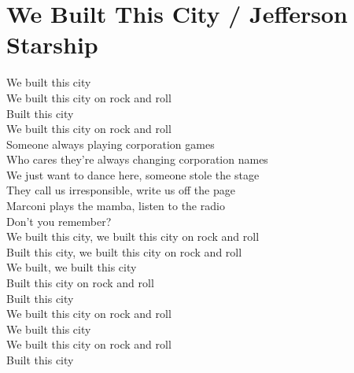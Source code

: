 \section{We Built This City / Jefferson Starship}\label{sec:webuiltthiscity}

  \Cmajor
  \Gmajor
  \Aminor
  \Fmajor
  
  
 We built this city \\
 We built this city on rock and  roll \\
 Built this city \\
 We built this city on rock and  roll \\

 Someone always playing corporation  games \\
Who cares they're always changing corporation  names \\
 We just want to dance here, someone stole the  stage \\
They call us irresponsible, write us off the  page \\

 Marconi plays the mamba, listen to the radio \\
 Don't you remember? \\
We built this city, we built this city on rock and  roll \\
 Built this city, we built this city on rock and  roll \\

 We built, we built this city \\
 Built this city on rock and roll \\
 Built this city \\
 We built this city on rock and  roll \\

 We built this city \\
 We built this city on rock and  roll \\
 Built this city \\
